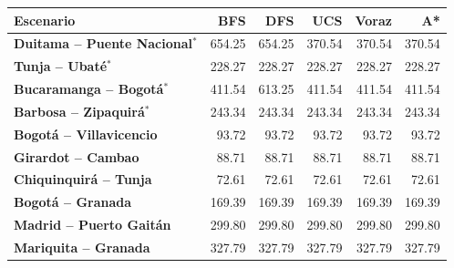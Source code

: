\renewcommand{\arraystretch}{1.2}
\begin{tabular}{|l|r|r|r|r|r|}
\hline
\rowcolor{gray!20} \textbf{Escenario} & \textbf{BFS} & \textbf{DFS} & \textbf{UCS} & \textbf{Voraz} & \textbf{A*} \\
\hline
\textbf{Duitama -- Puente Nacional$^{*}$} & 654.25 & 654.25 & 370.54 & 370.54 & 370.54 \\
\hline
\textbf{Tunja -- Ubaté$^{*}$} & 228.27 & 228.27 & 228.27 & 228.27 & 228.27 \\
\hline
\textbf{Bucaramanga -- Bogotá$^{*}$} & 411.54 & 613.25 & 411.54 & 411.54 & 411.54 \\
\hline
\textbf{Barbosa -- Zipaquirá$^{*}$} & 243.34 & 243.34 & 243.34 & 243.34 & 243.34 \\
\hline
\textbf{Bogotá -- Villavicencio} & 93.72 & 93.72 & 93.72 & 93.72 & 93.72 \\
\hline
\textbf{Girardot -- Cambao} & 88.71 & 88.71 & 88.71 & 88.71 & 88.71 \\
\hline
\textbf{Chiquinquirá -- Tunja} & 72.61 & 72.61 & 72.61 & 72.61 & 72.61 \\
\hline
\textbf{Bogotá -- Granada} & 169.39 & 169.39 & 169.39 & 169.39 & 169.39 \\
\hline
\textbf{Madrid -- Puerto Gaitán} & 299.80 & 299.80 & 299.80 & 299.80 & 299.80 \\
\hline
\textbf{Mariquita -- Granada} & 327.79 & 327.79 & 327.79 & 327.79 & 327.79 \\
\hline
\end{tabular}
